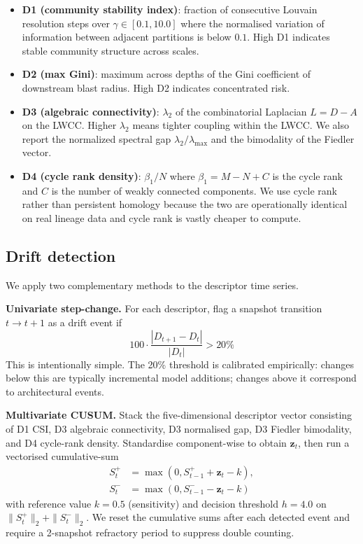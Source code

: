 \documentclass[11pt,a4paper]{article}
\begin{document}
\begin{itemize}
  \item \textbf{D1 (community stability index)}: fraction of
        consecutive Louvain resolution steps over $\gamma \in
        [0.1, 10.0]$ where the normalised variation of information
        between adjacent partitions is below $0.1$. High D1 indicates
        stable community structure across scales.
  \item \textbf{D2 (max Gini)}: maximum across depths of the Gini
        coefficient of downstream blast radius. High D2 indicates
        concentrated risk.
  \item \textbf{D3 (algebraic connectivity)}: $\lambda_2$ of the
        combinatorial Laplacian $L = D - A$ on the LWCC. Higher
        $\lambda_2$ means tighter coupling within the LWCC.
        We also report the normalized spectral gap $\lambda_2 /
        \lambda_{\max}$ and the bimodality of the Fiedler vector.
  \item \textbf{D4 (cycle rank density)}: $\beta_1 / N$ where
        $\beta_1 = M - N + C$ is the cycle rank and $C$ is the number
        of weakly connected components. We use cycle rank rather than
        persistent homology because the two are operationally
        identical on real lineage data \citep{hari2026descriptors}
        and cycle rank is vastly cheaper to compute.
\end{itemize}

\subsection{Drift detection}

We apply two complementary methods to the descriptor time series.

\textbf{Univariate step-change.} For each descriptor, flag a snapshot
transition $t \to t+1$ as a drift event if
\[
  100 \cdot \frac{|D_{t+1} - D_t|}{|D_t|} > 20\%
\]
This is intentionally simple. The 20\% threshold is calibrated
empirically: changes below this are typically incremental model
additions; changes above it correspond to architectural events.

\textbf{Multivariate CUSUM.} Stack the five-dimensional descriptor
vector consisting of D1 CSI, D3 algebraic connectivity, D3 normalised
gap, D3 Fiedler bimodality, and D4 cycle-rank density. Standardise
component-wise to obtain $\mathbf{z}_t$, then run a vectorised
cumulative-sum
\begin{align*}
  S^+_t &= \max(0, S^+_{t-1} + \mathbf{z}_t - k), \\
  S^-_t &= \max(0, S^-_{t-1} - \mathbf{z}_t - k)
\end{align*}
with reference value $k = 0.5$ (sensitivity) and decision threshold
$h = 4.0$ on $\|S^+_t\|_2 + \|S^-_t\|_2$. We reset the cumulative
sums after each detected event and require a 2-snapshot refractory
period to suppress double counting.
\end{document}
